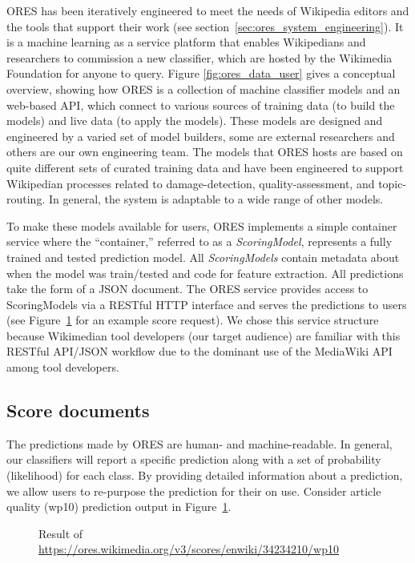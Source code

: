 
ORES has been iteratively engineered to meet the needs of Wikipedia editors and the tools that support their work (see section~\ref{sec:ores_system_engineering}). It is a machine learning as a service platform that enables Wikipedians and researchers to commission a new classifier, which are hosted by the Wikimedia Foundation for anyone to query. Figure  \ref{fig:ores_data_user} gives a conceptual overview, showing how ORES is a collection of machine classifier models and an web-based API, which connect to various sources of training data (to build the models) and live data (to apply the models). These models are designed and engineered by a varied set of model builders, some are external researchers and others are our own engineering team.  The models that ORES hosts are based on quite different sets of curated training data and have been engineered to support Wikipedian processes related to damage-detection, quality-assessment, and topic-routing. In general, the system is adaptable to a wide range of other models.

To make these models available for users, ORES implements a simple container service where the ``container,'' referred to as a \emph{ScoringModel}, represents a fully trained and tested prediction model.  All \emph{ScoringModels} contain metadata about when the model was train/tested and code for feature extraction.  All predictions take the form of a JSON document.  The ORES service provides access to ScoringModels via a RESTful HTTP interface and serves the predictions to users (see Figure~\ref{fig:english_wp10_prediction} for an example score request).  We chose this service structure because Wikimedian tool developers (our target audience) are familiar with this RESTful API/JSON workflow due to the dominant use of the MediaWiki API among tool developers.

\subsection{Score documents}
\label{sec:appendix.score_documents}
The predictions made by ORES are human- and machine-readable.  In general, our classifiers will report a specific prediction along with a set of probability (likelihood) for each class.  By providing detailed information about a prediction, we allow users to re-purpose the prediction for their on use.  Consider article quality (wp10) prediction output in Figure~\ref{fig:english_wp10_prediction}.

\begin{figure}[h!]
        \caption{Result of \url{https://ores.wikimedia.org/v3/scores/enwiki/34234210/wp10}}
        \label{fig:english_wp10_prediction}
\end{figure}

